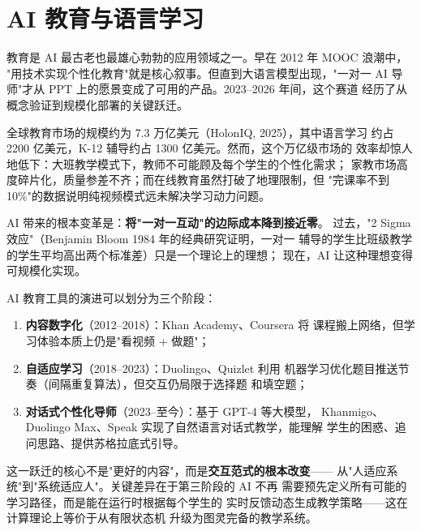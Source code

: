 
\section{AI 教育与语言学习}
\label{sec:life-tutoring}

教育是 AI 最古老也最雄心勃勃的应用领域之一。早在 2012 年 MOOC 浪潮中，
"用技术实现个性化教育"就是核心叙事。但直到大语言模型出现，"一对一
AI 导师"才从 PPT 上的愿景变成了可用的产品。2023--2026 年间，这个赛道
经历了从概念验证到规模化部署的关键跃迁。

全球教育市场的规模约为 7.3 万亿美元（HolonIQ, 2025），其中语言学习
约占 2200 亿美元，K-12 辅导约占 1300 亿美元。然而，这个万亿级市场的
效率却惊人地低下：大班教学模式下，教师不可能顾及每个学生的个性化需求；
家教市场高度碎片化，质量参差不齐；而在线教育虽然打破了地理限制，但
"完课率不到 10\%"的数据说明纯视频模式远未解决学习动力问题。

AI 带来的根本变革是：\textbf{将"一对一互动"的边际成本降到接近零}。
过去，"2 Sigma 效应"（Benjamin Bloom 1984 年的经典研究证明，一对一
辅导的学生比班级教学的学生平均高出两个标准差）只是一个理论上的理想；
现在，AI 让这种理想变得可规模化实现。

\begin{keybox}[AI 教育：从辅助到个性化]
\small
AI 教育工具的演进可以划分为三个阶段：
\begin{enumerate}
  \item \textbf{内容数字化}（2012--2018）：Khan Academy、Coursera 将
    课程搬上网络，但学习体验本质上仍是"看视频 + 做题"；
  \item \textbf{自适应学习}（2018--2023）：Duolingo、Quizlet 利用
    机器学习优化题目推送节奏（间隔重复算法），但交互仍局限于选择题
    和填空题；
  \item \textbf{对话式个性化导师}（2023--至今）：基于 GPT-4 等大模型，
    Khanmigo、Duolingo Max、Speak 实现了自然语言对话式教学，能理解
    学生的困惑、追问思路、提供苏格拉底式引导。
\end{enumerate}
这一跃迁的核心不是"更好的内容"，而是\textbf{交互范式的根本改变}——
从"人适应系统"到"系统适应人"。关键差异在于第三阶段的 AI 不再
需要预先定义所有可能的学习路径，而是能在运行时根据每个学生的
实时反馈动态生成教学策略——这在计算理论上等价于从有限状态机
升级为图灵完备的教学系统。
\end{keybox}


